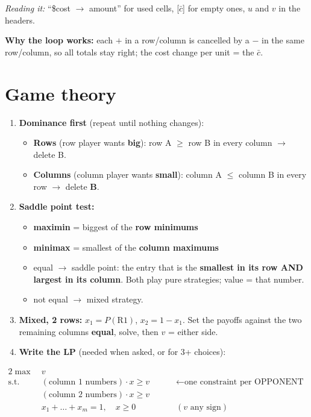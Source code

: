 \documentclass[10pt,a4paper]{article}
\newcommand{\reading}[1]{\textit{Reading it:} #1}
\begin{document}
\reading{``\$cost $\to$ amount'' for used cells, [$\bar c$] for empty ones, $u$ and $v$ in the headers.}

\textbf{Why the loop works:} each $+$ in a row/column is cancelled by a $-$ in the same row/column, so all totals stay right; the cost change per unit = the $\bar c$.

\section{Game theory}

\begin{enumerate}
  \item \textbf{Dominance first} (repeat until nothing changes):
  \begin{itemize}
    \item \textbf{Rows} (row player wants \textbf{big}): row A $\geq$ row B in every column $\to$ delete B.
    \item \textbf{Columns} (column player wants \textbf{small}): column A $\leq$ column B in every row $\to$ delete \textbf{B}.
  \end{itemize}
  \item \textbf{Saddle point test:}
  \begin{itemize}
    \item \textbf{maximin} = biggest of the \textbf{row minimums}
    \item \textbf{minimax} = smallest of the \textbf{column maximums}
    \item equal $\to$ saddle point: the entry that is the \textbf{smallest in its row AND largest in its column}. Both play pure strategies; value = that number.
    \item not equal $\to$ mixed strategy.
  \end{itemize}
  \item \textbf{Mixed, 2 rows:} $x_1 = P(\text{R1})$, $x_2 = 1 - x_1$. Set the payoffs against the two remaining columns \textbf{equal}, solve, then $v$ = either side.
  \item \textbf{Write the LP} (needed when asked, or for 3+ choices):
\end{enumerate}
\begin{work}
\begin{alignat*}{2}
\max\ & v \\
\text{s.t.}\ & (\text{column 1 numbers}) \cdot x \geq v &\qquad& \leftarrow \text{one constraint per OPPONENT column} \\
& (\text{column 2 numbers}) \cdot x \geq v \\
& x_1 + \dots + x_m = 1,\quad x \geq 0 && (v \text{ any sign})
\end{alignat*}
\end{work}
\end{document}

